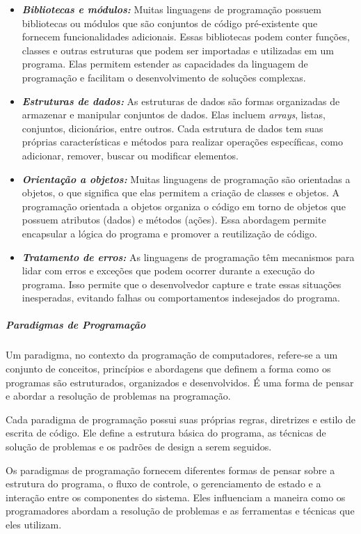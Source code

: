 \documentclass[a4paper, 12pt, onecolumn,singlespacing]{article}
\begin{document}
\begin{itemize}
		\item \textbf{\textit{Bibliotecas e módulos:}} Muitas linguagens de programação possuem bibliotecas ou módulos que são conjuntos de código pré-existente que fornecem funcionalidades adicionais. Essas bibliotecas podem conter funções, classes e outras estruturas que podem ser importadas e utilizadas em um programa. Elas permitem estender as capacidades da linguagem de programação e facilitam o desenvolvimento de soluções complexas.
		
		\item \textbf{\textit{Estruturas de dados:}} As estruturas de dados são formas organizadas de armazenar e manipular conjuntos de dados. Elas incluem \textit{arrays}, listas, conjuntos, dicionários, entre outros. Cada estrutura de dados tem suas próprias características e métodos para realizar operações específicas, como adicionar, remover, buscar ou modificar elementos.
		
		\item \textbf{\textit{Orientação a objetos:}} Muitas linguagens de programação são orientadas a objetos, o que significa que elas permitem a criação de classes e objetos. A programação orientada a objetos organiza o código em torno de objetos que possuem atributos (dados) e métodos (ações). Essa abordagem permite encapsular a lógica do programa e promover a reutilização de código.
		
		\item \textbf{\textit{Tratamento de erros:}} As linguagens de programação têm mecanismos para lidar com erros e exceções que podem ocorrer durante a execução do programa. Isso permite que o desenvolvedor capture e trate essas situações inesperadas, evitando falhas ou comportamentos indesejados do programa.
		
	\end{itemize}
	
	\subparagraph{Paradigmas de Programação} Um paradigma, no contexto da programação de computadores, refere-se a um conjunto de conceitos, princípios e abordagens que definem a forma como os programas são estruturados, organizados e desenvolvidos. É uma forma de pensar e abordar a resolução de problemas na programação.
	
	Cada paradigma de programação possui suas próprias regras, diretrizes e estilo de escrita de código. Ele define a estrutura básica do programa, as técnicas de solução de problemas e os padrões de design a serem seguidos.
	
	Os paradigmas de programação fornecem diferentes formas de pensar sobre a estrutura do programa, o fluxo de controle, o gerenciamento de estado e a interação entre os componentes do sistema. Eles influenciam a maneira como os programadores abordam a resolução de problemas e as ferramentas e técnicas que eles utilizam.
	
\end{document}
